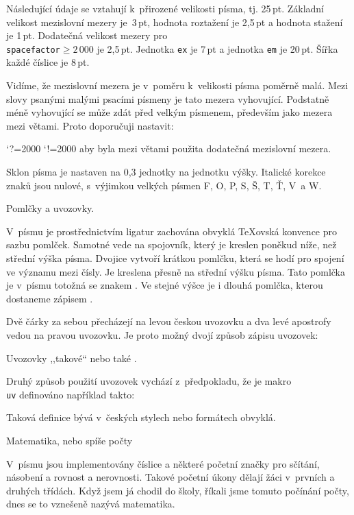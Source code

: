 Následující údaje se vztahují k~přirozené velikosti písma, tj. 25\,pt.
Základní velikost mezislovní mezery je~3\,pt, hodnota roztažení je
2,5\,pt a hodnota stažení je 1\,pt.
Dodatečná velikost mezery pro {\tt\\spacefactor}$\geq2\,000$ je 2,5\,pt.
Jednotka {\tt ex} je 7\,pt a jednotka
{\tt em} je 20\,pt. Šířka každé číslice je 8\,pt.

Vidíme, že mezislovní mezera je v~poměru k~velikosti písma poměrně
malá. Mezi slovy psanými malými psacími písmeny je tato mezera
vyhovující. Podstatně méně vyhovující se může zdát před velkým písmenem,
především jako mezera mezi větami. Proto doporučuji nastavit:

\begtt
\sfcode`?=2000  \sfcode`!=2000
\endtt
\noindent
aby byla mezi větami použita dodatečná mezislovní mezera.

Sklon písma je nastaven na 0,3 jednotky na jednotku výšky.
Italické korekce znaků jsou nulové, s~výjimkou velkých písmen 
F, O, P, S, Š, T, Ť, V~a W.


\sub Pomlčky a uvozovky.

V~písmu je prostřednictvím ligatur zachována obvyklá \TeX{}ovská konvence
pro sazbu pomlček. Samotné \uv{{\tt -}} vede na spojovník, který je kreslen
poněkud níže, než střední výška písma. Dvojice \uv{{\tt--}} vytvoří
krátkou pomlčku, která se hodí pro spojení ve významu  mezi čísly.
Je kreslena přesně na střední výšku písma. Tato pomlčka je v~písmu
totožná se znakem . Ve stejné výšce je i dlouhá pomlčka, kterou
dostaneme zápisem \uv{{\tt ---}}.

Dvě čárky za sebou přecházejí na levou českou uvozovku a dva levé apostrofy
vedou na pravou uvozovku. Je proto možný dvojí způsob zápisu uvozovek:

\begtt
Uvozovky ,,takové`` nebo také .
\endtt

Druhý způsob použití uvozovek vychází z~předpokladu, že je makro {\tt\\uv}
definováno například takto:

\begtt
\chardef{}  \chardef{}
\def\uv#1{\clqq#1\crqq}
\endtt

Taková definice bývá v~českých stylech nebo formátech obvyklá.


\sub Matematika, nebo spíše počty

V~písmu jsou implementovány číslice a některé početní značky pro sčítání,
násobení a rovnost a nerovnosti. Takové početní úkony dělají žáci v~prvních
a druhých třídách. Když jsem já chodil do školy, říkali jsme tomuto
počínání \uv{počty}, dnes se to vznešeně nazývá \uv{matematika}.

